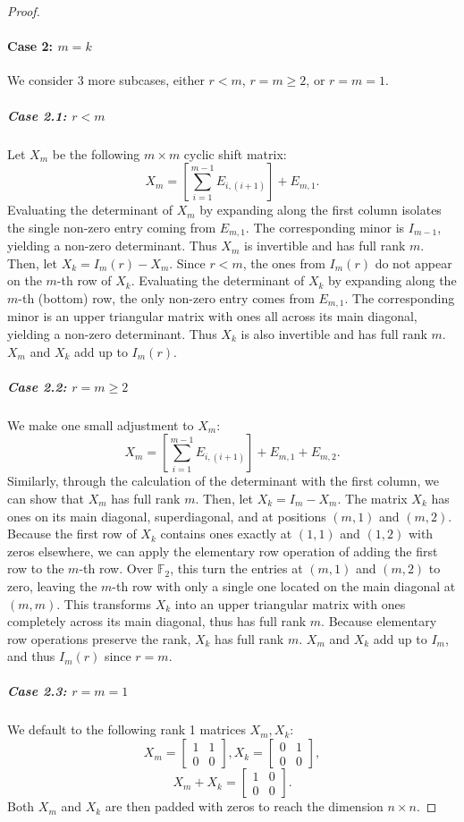 \documentclass[10pt,a4paper]{amsart}
\newcommand{\F}{\mathbb{F}}
\begin{document}
\begin{proof}
    \paragraph{Case 2: $m=k$}
    We consider 3 more subcases, either $r<m$, $r=m \geq 2$, or $r=m=1$.
    \subparagraph{Case 2.1: $r<m$}
    Let $X_m$ be the following $m\times m$ cyclic shift matrix:
    \[X_m = \left[ \sum_{i=1}^{m-1} E_{i,(i+1)} \right] + E_{m,1}.\]
    Evaluating the determinant of $X_m$ by expanding along the first column isolates the single non-zero entry coming from $E_{m,1}$. The corresponding minor is $I_{m-1}$, yielding a non-zero determinant. Thus $X_m$ is invertible and has full rank $m$. Then, let $X_k = I_m(r) - X_m$. Since $r<m$, the ones from $I_m(r)$ do not appear on the $m$-th row of $X_k$. Evaluating the determinant of $X_k$ by expanding along the $m$-th (bottom) row, the only non-zero entry comes from $E_{m,1}$. The corresponding minor is an upper triangular matrix with ones all across its main diagonal, yielding a non-zero determinant. Thus $X_k$ is also invertible and has full rank $m$. $X_m$ and $X_k$ add up to $I_m(r)$.
    \subparagraph{Case 2.2: $r=m \geq 2$}
    We make one small adjustment to $X_m$:
    \[X_m = \left[ \sum_{i=1}^{m-1} E_{i,(i+1)} \right] + E_{m,1} + E_{m,2}.\]
    Similarly, through the calculation of the determinant with the first column, we can show that $X_m$ has full rank $m$. Then, let $X_k = I_m - X_m$. The matrix $X_k$ has ones on its main diagonal, superdiagonal, and at positions $(m,1)$ and $(m,2)$. Because the first row of $X_k$ contains ones exactly at $(1,1)$ and $(1,2)$ with zeros elsewhere, we can apply the elementary row operation of adding the first row to the $m$-th row. Over $\F_2$, this turn the entries at $(m,1)$ and $(m,2)$ to zero, leaving the $m$-th row with only a single one located on the main diagonal at $(m,m)$. This transforms $X_k$ into an upper triangular matrix with ones completely across its main diagonal, thus has full rank $m$. Because elementary row operations preserve the rank, $X_k$ has full rank $m$. $X_m$ and $X_k$ add up to $I_m$, and thus $I_m(r)$ since $r=m$.
    \subparagraph{Case 2.3: $r=m=1$}
    We default to the following rank 1 matrices $X_m,X_k$:
    \[
    X_m = 
    \begin{bmatrix}
        1 & 1\\
        0 & 0
    \end{bmatrix},
    X_k =
    \begin{bmatrix}
        0 & 1\\
        0 & 0
    \end{bmatrix},
    \]
    \[
    X_m+X_k =
    \begin{bmatrix}
        1 & 0\\
        0 & 0
    \end{bmatrix}.
    \]
    Both $X_m$ and $X_k$ are then padded with zeros to reach the dimension $n\times n$.
\end{proof}
\end{document}
